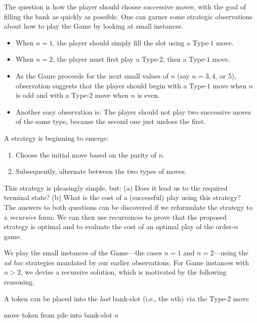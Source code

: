 The question is how the player should choose successive moves, with the goal of filling the bank as quickly as possible.  One can garner some strategic observations about how to play the Game by looking at small instances. 
\begin{itemize}
\item
When $n=1$, the player should simply fill the slot using a Type-$1$ move.
\medskip\item
When $n=2$, the player must first play a Type-$2$, then a Type-$1$ move. 
\medskip\item
As the Game proceeds for the next small values of $n$ (say $n=3, 4$, or $5$), observation suggests that the player should begin with a Type-$1$ move when $n$ is odd and with a Type-$2$ move when $n$ is even. 
\medskip\item
Another easy observation is: The player should not play two successive moves of the same type, because the second one just undoes the first.
\end{itemize}
A strategy is beginning to emerge:
\begin{enumerate}
\item
Choose the initial move based on the parity of $n$.
\medskip\item
Subsequently, alternate between the two types of moves.
\end{enumerate}
This strategy is pleasingly simple, but: (a) Does it lead us to the required terminal state?  (b) What is the cost of a (successful) play using this strategy?  The answers to both questions can be discovered if we reformulate the strategy to a {\em recursive} form:  We can then use recurrences to prove that the proposed strategy is optimal and to evaluate the cost of an optimal play of the order-$n$ game.

\bigskip

We play the small instances of the Game---the cases $n=1$ and $n=2$---using the {\it ad hoc} strategies mandated by our earlier observations.  For Game instances with $n > 2$, we devise a recursive solution, which is motivated by the following reasoning.

\medskip

A token can be placed into the {\em last} bank-slot (i.e., the $n$th) via the Type-$2$ move

\smallskip

\hspace*{.35in}
{\sc move token from pile into bank-slot} $n$

\smallskip

